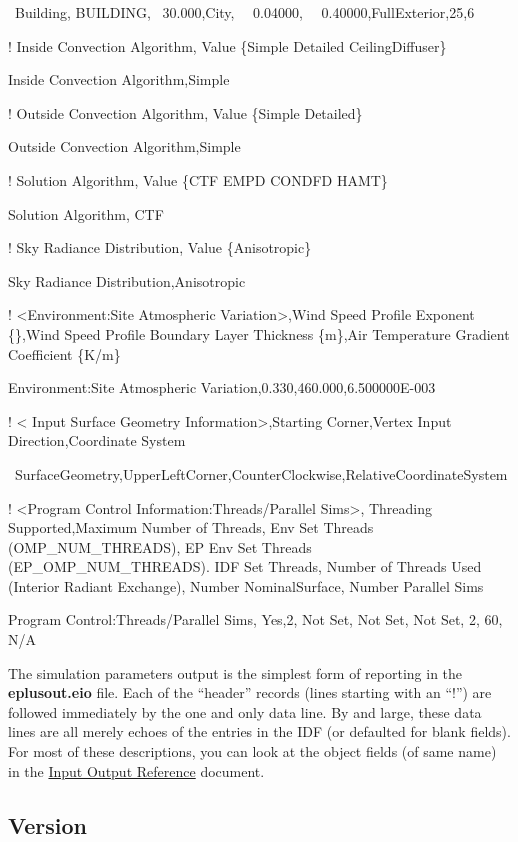 ~Building, BUILDING,~ 30.000,City,~~ 0.04000,~~ 0.40000,FullExterior,25,6

! Inside Convection Algorithm, Value \{Simple \textbar{} Detailed \textbar{} CeilingDiffuser\}

Inside Convection Algorithm,Simple

! Outside Convection Algorithm, Value \{Simple \textbar{} Detailed\}

Outside Convection Algorithm,Simple

! Solution Algorithm, Value \{CTF \textbar{} EMPD \textbar{} CONDFD \textbar{} HAMT\}

Solution Algorithm, CTF

! Sky Radiance Distribution, Value \{Anisotropic\}

Sky Radiance Distribution,Anisotropic

! \textless{}Environment:Site Atmospheric Variation\textgreater{},Wind Speed Profile Exponent \{\},Wind Speed Profile Boundary Layer Thickness \{m\},Air Temperature Gradient Coefficient \{K/m\}

Environment:Site Atmospheric Variation,0.330,460.000,6.500000E-003

! \textless{} Input Surface Geometry Information\textgreater{},Starting Corner,Vertex Input Direction,Coordinate System

~SurfaceGeometry,UpperLeftCorner,CounterClockwise,RelativeCoordinateSystem

! \textless{}Program Control Information:Threads/Parallel Sims\textgreater{}, Threading Supported,Maximum Number of Threads, Env Set Threads (OMP\_NUM\_THREADS), EP Env Set Threads (EP\_OMP\_NUM\_THREADS). IDF Set Threads, Number of Threads Used (Interior Radiant Exchange), Number NominalSurface, Number Parallel Sims

Program Control:Threads/Parallel Sims, Yes,2, Not Set, Not Set, Not Set, 2, 60, N/A

The simulation parameters output is the simplest form of reporting in the \textbf{eplusout.eio} file. Each of the ``header'' records (lines starting with an ``!'') are followed immediately by the one and only data line. By and large, these data lines are all merely echoes of the entries in the IDF (or defaulted for blank fields). For most of these descriptions, you can look at the object fields (of same name) in the \href{file:///E:/Docs4PDFs/InputOutputReference.pdf}{Input Output Reference} document.

\subsection{Version}\label{version}

